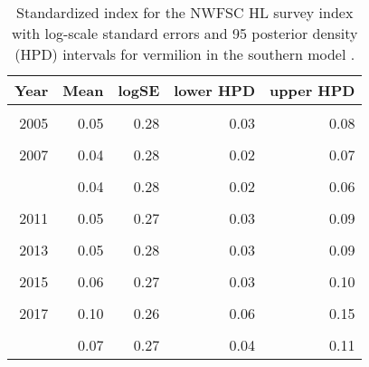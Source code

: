 \documentclass[
]{article}
\begin{document}
\begin{table}

\caption{\label{tab:tab-index-nwfschl}Standardized index for the NWFSC HL survey index with log-scale standard errors and 95%
       posterior density (HPD) intervals for vermilion in the southern model .}
\centering
\begin{tabular}[t]{rrrrr}
\toprule
Year & Mean & logSE & lower HPD & upper HPD\\
\midrule
\cellcolor{gray!6}{2004} & \cellcolor{gray!6}{0.04} & \cellcolor{gray!6}{0.28} & \cellcolor{gray!6}{0.02} & \cellcolor{gray!6}{0.07}\\
2005 & 0.05 & 0.28 & 0.03 & 0.08\\
\cellcolor{gray!6}{2006} & \cellcolor{gray!6}{0.04} & \cellcolor{gray!6}{0.28} & \cellcolor{gray!6}{0.02} & \cellcolor{gray!6}{0.07}\\
2007 & 0.04 & 0.28 & 0.02 & 0.07\\
\cellcolor{gray!6}{2008} & \cellcolor{gray!6}{0.03} & \cellcolor{gray!6}{0.28} & \cellcolor{gray!6}{0.01} & \cellcolor{gray!6}{0.04}\\
\addlinespace
2009 & 0.04 & 0.28 & 0.02 & 0.06\\
\cellcolor{gray!6}{2010} & \cellcolor{gray!6}{0.04} & \cellcolor{gray!6}{0.28} & \cellcolor{gray!6}{0.02} & \cellcolor{gray!6}{0.06}\\
2011 & 0.05 & 0.27 & 0.03 & 0.09\\
\cellcolor{gray!6}{2012} & \cellcolor{gray!6}{0.05} & \cellcolor{gray!6}{0.28} & \cellcolor{gray!6}{0.03} & \cellcolor{gray!6}{0.07}\\
2013 & 0.05 & 0.28 & 0.03 & 0.09\\
\addlinespace
\cellcolor{gray!6}{2014} & \cellcolor{gray!6}{0.06} & \cellcolor{gray!6}{0.27} & \cellcolor{gray!6}{0.03} & \cellcolor{gray!6}{0.09}\\
2015 & 0.06 & 0.27 & 0.03 & 0.10\\
\cellcolor{gray!6}{2016} & \cellcolor{gray!6}{0.06} & \cellcolor{gray!6}{0.27} & \cellcolor{gray!6}{0.03} & \cellcolor{gray!6}{0.09}\\
2017 & 0.10 & 0.26 & 0.06 & 0.15\\
\cellcolor{gray!6}{2018} & \cellcolor{gray!6}{0.09} & \cellcolor{gray!6}{0.26} & \cellcolor{gray!6}{0.05} & \cellcolor{gray!6}{0.14}\\
\addlinespace
2019 & 0.07 & 0.27 & 0.04 & 0.11\\
\bottomrule
\end{tabular}
\end{table}
\end{document}
